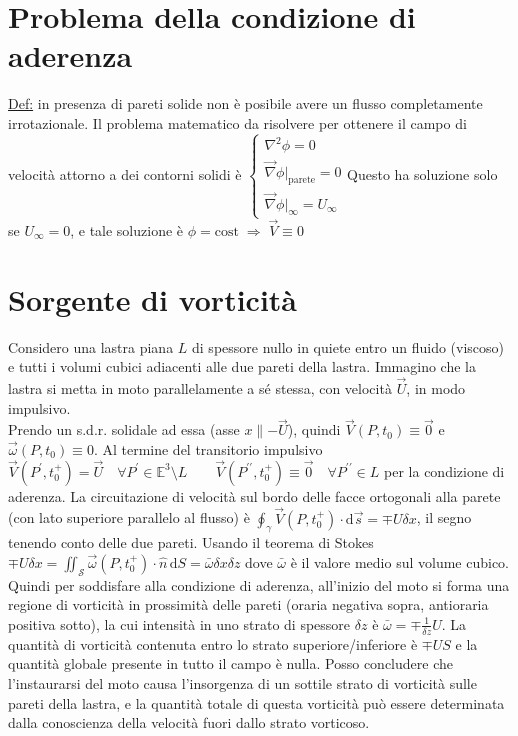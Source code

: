 \documentclass[11pt,a4paper]{report}
\newcommand{\de}{\mathrm d}
\begin{document}
	\section{Problema della condizione di aderenza}	\label{cond aderenza}
	\underline{Def:} in presenza di pareti solide non è posibile avere un flusso completamente irrotazionale. Il problema matematico da risolvere per ottenere il campo di velocità attorno a dei contorni solidi è $\begin{cases}\nabla^2\phi=0\\\vec\nabla\phi|_\mathrm{parete}=0\\\vec\nabla\phi|_\infty=U_\infty\end{cases}$Questo ha soluzione solo se $U_\infty=0$, e tale soluzione è $\phi=\mathrm{cost}\;\Rightarrow\;\vec V\equiv 0$
	
	\section{Sorgente di vorticità}	\label{lastra}
	Considero una lastra piana $L$ di spessore nullo in quiete entro un fluido (viscoso) e tutti i volumi cubici adiacenti alle due pareti della lastra. Immagino che la lastra si metta in moto parallelamente a sé stessa, con velocità $\vec U$, in modo impulsivo.\\Prendo un s.d.r. solidale ad essa (asse $x\parallel -\vec U$), quindi $\vec V(P,t_0)\equiv\vec 0$ e $\vec\omega(P,t_0)\equiv 0$. Al termine del transitorio impulsivo $\vec V(P^\prime,t_0^+)=\vec U\quad\forall P^\prime\in\mathbb{E}^3\!\setminus\!L\qquad\vec V(P^{\prime\prime},t_0^+)\equiv\vec 0\quad\forall P^{\prime\prime}\in L$ per la condizione di aderenza. La circuitazione di velocità sul bordo delle facce ortogonali alla parete (con lato superiore parallelo al flusso) è $\oint_\gamma\vec V(P,t_0^+)\cdot\de \vec s=\mp U\delta x$, il segno tenendo conto delle due pareti. Usando il teorema di Stokes $\mp U\delta x=\iint_\mathcal S \vec\omega(P,t_0^+)\cdot\hat n\,\de S=\bar\omega\delta x\delta z$ dove $\bar\omega$ è il valore medio sul volume cubico. Quindi per soddisfare alla condizione di aderenza, all'inizio del moto si forma una regione di vorticità in prossimità delle pareti (oraria negativa sopra, antioraria positiva sotto), la cui intensità in uno strato di spessore $\delta z$ è $\bar\omega=\mp\frac{1}{\delta z}U$. La quantità di vorticità contenuta entro lo strato superiore/inferiore è $\mp US$ e la quantità globale presente in tutto il campo è nulla. Posso concludere che l'instaurarsi del moto causa l'insorgenza di un sottile strato di vorticità sulle pareti della lastra, e la quantità totale di questa vorticità può essere determinata dalla conoscienza della velocità fuori dallo strato vorticoso.	
	
\end{document}

